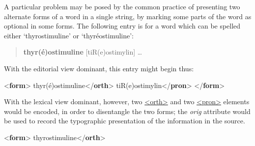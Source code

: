 A particular problem may be posed by the common practice of presenting two alternate forms of a word in a single string, by marking some parts of the word as optional in some forms. The following entry is for a word which can be spelled either ‘thyrostimuline’ or ‘thyréostimuline’:
\begin{quote}{\bfseries thyr(é)ostimuline} [tiR(e)ostimylin] …\end{quote}
 With the editorial view dominant, this entry might begin thus:\par\bgroup{}\exampleFont \begin{shaded}\noindent\mbox{}{<\textbf{form}>}\mbox{}\newline 
{}thyr(é)ostimuline{</\textbf{orth}>}\mbox{}\newline 
{}tiR(e)ostimylin{</\textbf{pron}>}\mbox{}\newline 
{</\textbf{form}>}\end{shaded}\egroup\par \noindent  With the lexical view dominant, however, two \hyperref[TEI.orth]{<orth>} and two \hyperref[TEI.pron]{<pron>} elements would be encoded, in order to disentangle the two forms; the {\itshape orig} attribute would be used to record the typographic presentation of the information in the source.\par\bgroup{}\exampleFont \begin{shaded}\noindent\mbox{}{<\textbf{form}>}\mbox{}\newline 
{}thyrostimuline{</\textbf{orth}>}\mbox{}\newline 

\end{shaded}
